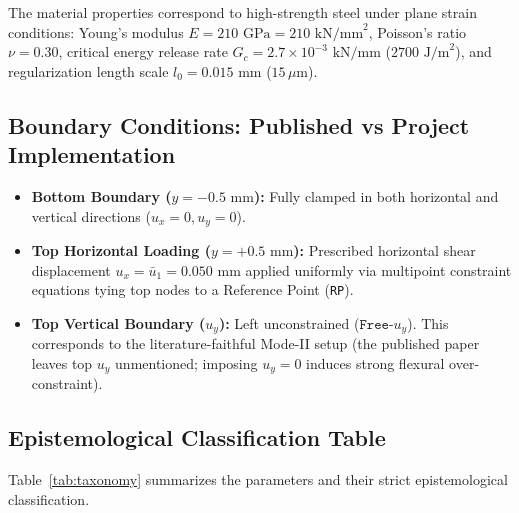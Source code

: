 \documentclass[11pt,a4paper]{article}
\begin{document}
The material properties correspond to high-strength steel under plane strain conditions: Young's modulus $E = 210\text{ GPa} = 210\text{ kN/mm}^2$, Poisson's ratio $\nu = 0.30$, critical energy release rate $G_c = 2.7\times 10^{-3}\text{ kN/mm}$ ($2700\text{ J/m}^2$), and regularization length scale $l_0 = 0.015\text{ mm}$ ($15\,\mu\text{m}$).

\subsection{Boundary Conditions: Published vs Project Implementation}
\begin{itemize}[leftmargin=*]
    \item \textbf{Bottom Boundary ($y = -0.5\text{ mm}$):} Fully clamped in both horizontal and vertical directions ($u_x = 0, u_y = 0$).
    \item \textbf{Top Horizontal Loading ($y = +0.5\text{ mm}$):} Prescribed horizontal shear displacement $u_x = \bar{u}_1 = 0.050\text{ mm}$ applied uniformly via multipoint constraint equations tying top nodes to a Reference Point (\texttt{RP}).
    \item \textbf{Top Vertical Boundary ($u_y$):} Left unconstrained ($\mathtt{Free\text{-}}u_y$). This corresponds to the literature-faithful Mode-II setup (the published paper leaves top $u_y$ unmentioned; imposing $u_y=0$ induces strong flexural over-constraint).
\end{itemize}

\subsection{Epistemological Classification Table}
Table~\ref{tab:taxonomy} summarizes the parameters and their strict epistemological classification.
\end{document}
